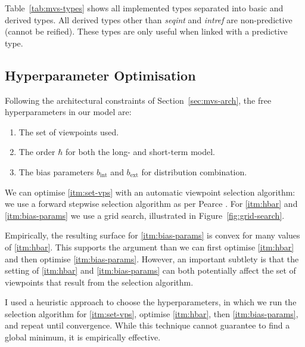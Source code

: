 \documentclass[12pt,a4paper,twoside,openright]{report}
\begin{document}
Table~\ref{tab:mvs-types} shows all implemented types separated into basic and
derived types. All derived types other than \emph{seqint} and \emph{intref} are
non-predictive (cannot be reified). These types are only useful when linked with
a predictive type.

\subsection{Hyperparameter Optimisation}\label{sec:mvs-hyperparams}

Following the architectural constraints of Section~\ref{sec:mvs-arch}, the
free hyperparameters in our model are:
\begin{enumerate}[label=(\arabic*), itemsep=0mm]
  \item The set of viewpoints used. \label{itm:set-vps}
  \item The order $\hbar$ for both the long- and short-term
    model. \label{itm:hbar}
  \item The bias parameters $b_{\mathrm{int}}$ and $b_{\mathrm{ext}}$ for
    distribution combination.
    \label{itm:bias-params}
\end{enumerate}

We can optimise \ref{itm:set-vps} with an automatic viewpoint selection
algorithm: we use a forward stepwise selection algorithm as per Pearce
\cite{pearce2005construction}. For \ref{itm:hbar} and \ref{itm:bias-params} we
use a grid search, illustrated in Figure~\ref{fig:grid-search}. 

Empirically, the resulting surface for \ref{itm:bias-params} is convex for many
values of \ref{itm:hbar}. This supports the argument than we can first optimise
\ref{itm:hbar} and then optimise \ref{itm:bias-params}. However, an important
subtlety is that the setting of \ref{itm:hbar} and \ref{itm:bias-params} can
both potentially affect the set of viewpoints that result from the selection
algorithm.

I used a heuristic approach to choose the hyperparameters, in which we run the
selection algorithm for \ref{itm:set-vps}, optimise \ref{itm:hbar}, then
\ref{itm:bias-params}, and repeat until convergence. While this technique cannot
guarantee to find a global minimum, it is empirically effective.
\end{document}
